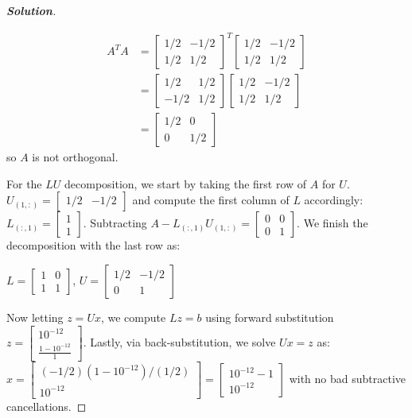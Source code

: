 \documentclass[11pt]{article}
\newenvironment{solution}{%
  \begin{proof}[\textbf{Solution}]$ $\par\nobreak\ignorespaces
}{%
  \end{proof}
}
\theoremstyle{definition}
\begin{document}
\begin{solution}
\begin{align*}
    A^T A &= \begin{bmatrix*}1/2 & -1/2 \\ 1/2 & 1/2\end{bmatrix*}^T \begin{bmatrix*}1/2 & -1/2 \\ 1/2 & 1/2\end{bmatrix*} \\
    &= \begin{bmatrix*}1/2 & 1/2 \\ -1/2 & 1/2\end{bmatrix*} \begin{bmatrix*}1/2 & -1/2 \\ 1/2 & 1/2\end{bmatrix*} \\
    &= \begin{bmatrix*}1/2  & 0 \\ 0 & 1/2 \end{bmatrix*}
\end{align*}
so $A$ is not orthogonal.

For the $LU$ decomposition, we start by taking the first row of $A$ for $U$. $U_{(1, :)} = \begin{bmatrix*}1/2 & -1/2\end{bmatrix*}$ and compute the first column of $L$ accordingly: $L_{(:, 1)} = \begin{bmatrix*}1 \\ 1\end{bmatrix*}$. Subtracting $A - L_{(:, 1)} U_{(1, :)} = \begin{bmatrix*}
    0 & 0 \\ 0 & 1
\end{bmatrix*}$. We finish the decomposition with the last row as:

$L = \begin{bmatrix*}
    1 & 0 \\
    1 & 1
\end{bmatrix*}$, $U = \begin{bmatrix*}
    1/2 & -1/2 \\ 0 & 1
\end{bmatrix*}$

Now letting $z = Ux$, we compute $Lz = b$ using forward substitution $z = \begin{bmatrix*}
    10^{-12} \\
    \frac{1 - 10^{-12}}{1}
\end{bmatrix*}$. Lastly, via back-substitution, we solve $Ux = z$ as: $x = \begin{bmatrix*}
    (-1/2)(1 - 10^{-12})/(1/2)\\
    10^{-12}
\end{bmatrix*} = \begin{bmatrix*}
    10^{-12} - 1 \\ 10^{-12}
\end{bmatrix*}$ with no bad subtractive cancellations.
\end{solution}
\newpage
\end{document}
